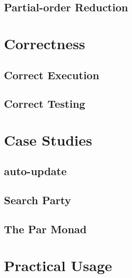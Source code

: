 \documentclass[openright, dottedtoc, headinclude, footinclude=true, a4paper, numbers=noenddot, fontsize=10pt]{scrreprt}
\begin{document}
  \subsection{Partial-order Reduction}
  \label{sec:sct-por}
  

\section{Correctness}
\label{chap:correctness}


  \subsection{Correct Execution}
  \label{sec:correctness-execution}
  

  \subsection{Correct Testing}
  \label{sec:correctness-testing}
  

\section{Case Studies}
\label{chap:casestudies}


  \subsection{auto-update}
  \label{sec:casestudies-autoupdate}
  

  \subsection{Search Party}
  \label{sec:casestudies-searchparty}
  

  \subsection{The Par Monad}
  \label{sec:casestudies-parmonad}
  

\section{Practical Usage}
\label{chap:practice}

\end{document}
